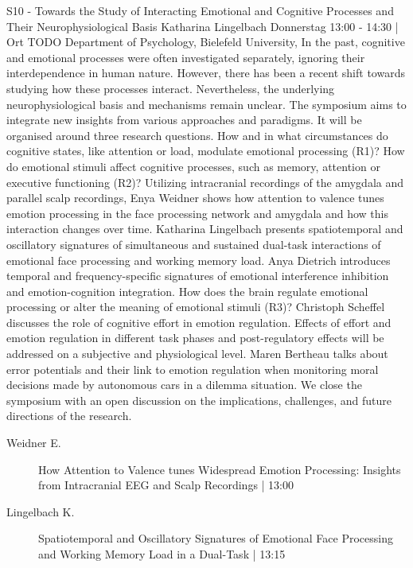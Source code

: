 
            \begin{symposium}
            {S10 - Towards the Study of Interacting Emotional and Cognitive Processes and Their Neurophysiological Basis}
            {Katharina Lingelbach}
            {Donnerstag 13:00 - 14:30 | Ort TODO}
            {Department of Psychology, Bielefeld University,}
            In the past, cognitive and emotional processes were often investigated separately, ignoring their interdependence in human nature. However, there has been a recent shift towards studying how these processes interact. Nevertheless, the underlying neurophysiological basis and mechanisms remain unclear.
The symposium aims to integrate new insights from various approaches and paradigms. It will be organised around three research questions. How and in what circumstances do cognitive states, like attention or load, modulate emotional processing (R1)? How do emotional stimuli affect cognitive processes, such as memory, attention or executive functioning (R2)?
Utilizing intracranial recordings of the amygdala and parallel scalp recordings, Enya Weidner shows how attention to valence tunes emotion processing in the face processing network and amygdala and how this interaction changes over time. Katharina Lingelbach presents spatiotemporal and oscillatory signatures of simultaneous and sustained dual-task interactions of emotional face processing and working memory load. Anya Dietrich introduces temporal and frequency-specific signatures of emotional interference inhibition and emotion-cognition integration.
How does the brain regulate emotional processing or alter the meaning of emotional stimuli (R3)?
Christoph Scheffel discusses the role of cognitive effort in emotion regulation. Effects of effort and emotion regulation in different task phases and post-regulatory effects will be addressed on a subjective and physiological level. Maren Bertheau talks about error potentials and their link to emotion regulation when monitoring moral decisions made by autonomous cars in a dilemma situation.
We close the symposium with an open discussion on the implications, challenges, and future directions of the research.
            \begin{description}    
            
                \item [ Weidner E.] How Attention to Valence tunes Widespread Emotion Processing: Insights from Intracranial EEG and Scalp Recordings \textcolor{mygray}{ | 13:00}    
                
                \item [ Lingelbach K.] Spatiotemporal and Oscillatory Signatures of Emotional Face Processing and Working Memory Load in a Dual-Task \textcolor{mygray}{ | 13:15}    
                

\end{description}
\end{symposium}
